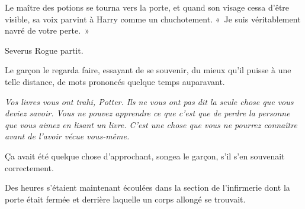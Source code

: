 Le maître des potions se tourna vers la porte, et quand son visage cessa d'être visible, sa voix parvint à Harry comme un chuchotement.
«~Je suis véritablement navré de votre perte.~»

Severus Rogue partit.

Le garçon le regarda faire, essayant de se souvenir, du mieux qu'il puisse à une telle distance, de mots prononcés quelque temps auparavant.

\emph{Vos livres vous ont trahi, Potter.
Ils ne vous ont pas dit la seule chose que vous deviez savoir.
Vous ne pouvez apprendre ce que c'est que de perdre la personne que vous aimez en lisant un livre.
C'est une chose que vous ne pourrez connaître avant de l'avoir vécue vous-même.}

Ça avait été quelque chose d'approchant, songea le garçon, s'il s'en souvenait correctement.

\later

Des heures s'étaient maintenant écoulées dans la section de l'infirmerie dont la porte était fermée et derrière laquelle un corps allongé se trouvait.

